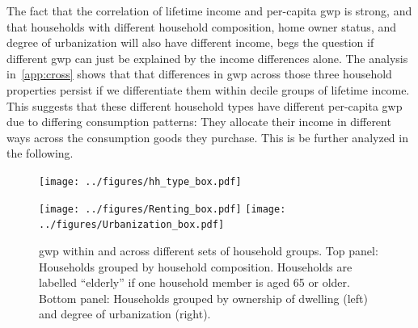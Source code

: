 \documentclass[a4paper,11pt,abstract=true]{scrartcl}
\begin{document}
The fact that the correlation of lifetime income and per-capita \ac{gwp} is strong, and that households with different household composition, home owner status, and degree of urbanization will also have different income,  begs the question if different \ac{gwp} can just be explained by the income differences alone.
The analysis in~\ref{app:cross} shows that that differences in \ac{gwp} across those three household properties persist if we differentiate them within decile groups of lifetime income.
This suggests that these different household types have different per-capita \ac{gwp} due to differing consumption patterns: They allocate their income in different ways across the consumption goods they purchase.
This is be further analyzed in the following.

\begin{figure}[htp]
  \centering
  \texttt{[image: ../figures/hh\_type\_box.pdf]}

  \texttt{[image: ../figures/Renting\_box.pdf]}
  \texttt{[image: ../figures/Urbanization\_box.pdf]}
  \caption[\ac{gwp} across HH types]{%
    \ac{gwp} within and across different sets of household groups.
    Top panel: Households grouped by household composition.
    Households are labelled ``elderly'' if one household member is aged 65 or older.
    Bottom panel: Households grouped by ownership of dwelling (left) and degree of urbanization (right).
  }
  \label{fig:types}
\end{figure}





\end{document}
